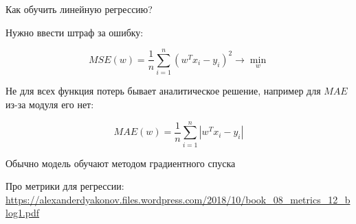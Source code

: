 \documentclass[notes,12pt, aspectratio=169]{beamer}
\newenvironment{wideitemize}{\itemize\addtolength{\itemsep}{10pt}}{\enditemize}
\begin{document}
\begin{frame}{Как обучить линейную регрессию?}
\begin{wideitemize}
	
\item Нужно ввести штраф за ошибку: 

\[
MSE(w) = \frac{1}{n} \sum_{i=1}^n (w^T x_i - y_i)^2   \to \min_{w}
\]

\item Не для всех функция потерь бывает аналитическое решение, например для $MAE$ из-за модуля его нет:  

\[ 
MAE(w) = \frac{1}{n} \sum_{i=1}^n |w^Tx_i - y_i|
\]

\item \alert{Обычно модель обучают методом градиентного спуска}
\end{wideitemize} 

\vfill 
\scriptsize Про метрики для регрессии: \\
\color{blue} \url{https://alexanderdyakonov.files.wordpress.com/2018/10/book_08_metrics_12_blog1.pdf}
\end{frame}
\end{document}

